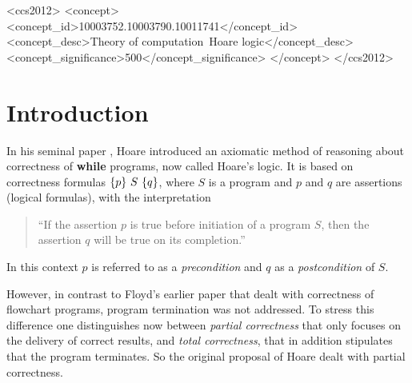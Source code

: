 \documentclass[manuscript, screen, review]{acmart}
\begin{document}
\begin{CCSXML}
<ccs2012>
<concept>
<concept_id>10003752.10003790.10011741</concept_id>
<concept_desc>Theory of computation~Hoare logic</concept_desc>
<concept_significance>500</concept_significance>
</concept>
</ccs2012>
\end{CCSXML}





\maketitle




\section{Introduction}

In his seminal paper \cite{Hoa69}, Hoare introduced an axiomatic method of reasoning
about correctness of \textbf{while} programs, now called Hoare's logic. 
It is based on correctness formulas
$\mbox{$\{{p}\}\ {S}\ \{{q}\}$}$, where $S$ is a program and $p$ and $q$ are assertions
(logical formulas), with the interpretation
   \begin{quote}
   ``If the assertion $p$ is true before initiation of a program $S$,
     then the assertion $q$ will be true on its completion.''
   \end{quote}
In this context $p$ is referred to as a \emph{precondition} and $q$ as 
a \emph{postcondition} of $S$.

However, in contrast to Floyd's earlier paper \cite{Flo67a} that dealt
with correctness of flowchart programs, program termination was not
addressed. To stress this difference one distinguishes now between
\emph{partial correctness} that only focuses on the delivery of
correct results, and \emph{total correctness}, that in addition
stipulates that the program terminates.  So the original proposal of
Hoare dealt with partial correctness.
\end{document}
